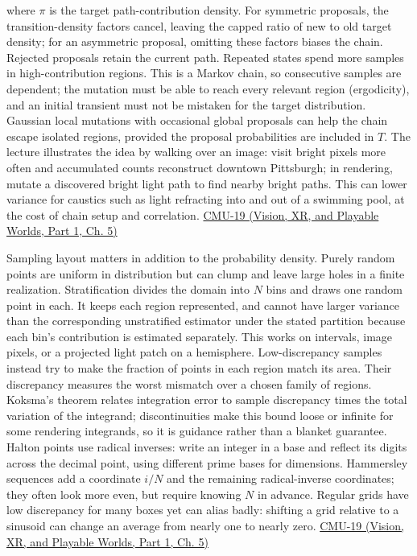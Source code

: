 where \(\pi\) is the target path-contribution density. For symmetric proposals, the transition-density factors cancel, leaving the capped ratio of new to old target density; for an asymmetric proposal, omitting these factors biases the chain. Rejected proposals retain the current path. Repeated states spend more samples in high-contribution regions. This is a Markov chain, so consecutive samples are dependent; the mutation must be able to reach every relevant region (ergodicity), and an initial transient must not be mistaken for the target distribution. Gaussian local mutations with occasional global proposals can help the chain escape isolated regions, provided the proposal probabilities are included in \(T\). The lecture illustrates the idea by walking over an image: visit bright pixels more often and accumulated counts reconstruct downtown Pittsburgh; in rendering, mutate a discovered bright light path to find nearby bright paths. This can lower variance for caustics such as light refracting into and out of a swimming pool, at the cost of chain setup and correlation. \href{../07-Vision-XR-and-Playable-Worlds-P01/main.pdf\#nameddest=04-visual-computing-ii-ch036-cmu-19---variance-reduction}{CMU-19 (Vision, XR, and Playable Worlds, Part 1, Ch. 5)}

Sampling layout matters in addition to the probability density. Purely random points are uniform in distribution but can clump and leave large holes in a finite realization. Stratification divides the domain into \(N\) bins and draws one random point in each. It keeps each region represented, and cannot have larger variance than the corresponding unstratified estimator under the stated partition because each bin's contribution is estimated separately. This works on intervals, image pixels, or a projected light patch on a hemisphere. Low-discrepancy samples instead try to make the fraction of points in each region match its area. Their discrepancy measures the worst mismatch over a chosen family of regions. Koksma's theorem relates integration error to sample discrepancy times the total variation of the integrand; discontinuities make this bound loose or infinite for some rendering integrands, so it is guidance rather than a blanket guarantee. Halton points use radical inverses: write an integer in a base and reflect its digits across the decimal point, using different prime bases for dimensions. Hammersley sequences add a coordinate \(i/N\) and the remaining radical-inverse coordinates; they often look more even, but require knowing \(N\) in advance. Regular grids have low discrepancy for many boxes yet can alias badly: shifting a grid relative to a sinusoid can change an average from nearly one to nearly zero. \href{../07-Vision-XR-and-Playable-Worlds-P01/main.pdf\#nameddest=04-visual-computing-ii-ch036-cmu-19---variance-reduction}{CMU-19 (Vision, XR, and Playable Worlds, Part 1, Ch. 5)}

